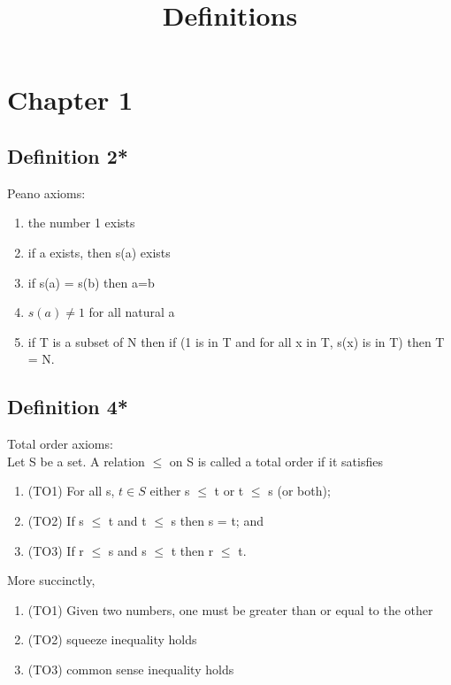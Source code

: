 \documentclass{article}
\title{Definitions}
\begin{document}
\maketitle
\newpage{}

\section*{Chapter 1}
\subsection{Definition 2*}
Peano axioms:
\begin{enumerate}
\item the number 1 exists
\item if a exists, then s(a) exists
\item if s(a) = s(b) then a=b
\item $s(a) \neq 1$ for all natural a
\item if T is a subset of N then if (1 is in T and for all x in T,
s(x) is in T) then T = N.
\end{enumerate}
\subsection{Definition 4*}
Total order axioms: \\
\newline
Let S be a set. A relation $\leq$ on S is called a total order if it satisfies
\begin{enumerate}
\item (TO1) For all s, $t \in S$ either s $\leq$ t or t $\leq$ s (or both);
\item (TO2) If s $\leq$ t and t $\leq$ s then s = t; and
\item (TO3) If r $\leq$ s and s $\leq$ t then r $\leq$ t.
\end{enumerate}
More succinctly,
\begin{enumerate}
\item (TO1) Given two numbers, one must be greater than or equal to the other
\item (TO2) squeeze inequality holds
\item (TO3) common sense inequality holds
\end{enumerate}
\end{document}
